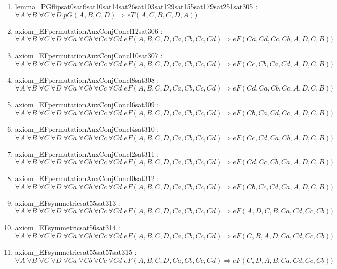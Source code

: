 \documentclass{article}
\begin{document}
\begin{enumerate}
\item lemma\_PGflipsat0sat6sat10sat14sat26sat103sat129sat155sat179sat251sat305 : $\forall A\;\forall B\;\forall C\;\forall D\;pG(A, B, C, D) \Rightarrow eT(A, C, B, C, D, A))$
\item axiom\_EFpermutationAuxConjConcl12sat306 : $\forall A\;\forall B\;\forall C\;\forall D\;\forall Ca\;\forall Cb\;\forall Cc\;\forall Cd\;eF(A, B, C, D, Ca, Cb, Cc, Cd) \Rightarrow eF(Ca, Cd, Cc, Cb, A, D, C, B))$
\item axiom\_EFpermutationAuxConjConcl10sat307 : $\forall A\;\forall B\;\forall C\;\forall D\;\forall Ca\;\forall Cb\;\forall Cc\;\forall Cd\;eF(A, B, C, D, Ca, Cb, Cc, Cd) \Rightarrow eF(Cc, Cb, Ca, Cd, A, D, C, B))$
\item axiom\_EFpermutationAuxConjConcl8sat308 : $\forall A\;\forall B\;\forall C\;\forall D\;\forall Ca\;\forall Cb\;\forall Cc\;\forall Cd\;eF(A, B, C, D, Ca, Cb, Cc, Cd) \Rightarrow eF(Cd, Ca, Cb, Cc, A, D, C, B))$
\item axiom\_EFpermutationAuxConjConcl6sat309 : $\forall A\;\forall B\;\forall C\;\forall D\;\forall Ca\;\forall Cb\;\forall Cc\;\forall Cd\;eF(A, B, C, D, Ca, Cb, Cc, Cd) \Rightarrow eF(Cb, Ca, Cd, Cc, A, D, C, B))$
\item axiom\_EFpermutationAuxConjConcl4sat310 : $\forall A\;\forall B\;\forall C\;\forall D\;\forall Ca\;\forall Cb\;\forall Cc\;\forall Cd\;eF(A, B, C, D, Ca, Cb, Cc, Cd) \Rightarrow eF(Cc, Cd, Ca, Cb, A, D, C, B))$
\item axiom\_EFpermutationAuxConjConcl2sat311 : $\forall A\;\forall B\;\forall C\;\forall D\;\forall Ca\;\forall Cb\;\forall Cc\;\forall Cd\;eF(A, B, C, D, Ca, Cb, Cc, Cd) \Rightarrow eF(Cd, Cc, Cb, Ca, A, D, C, B))$
\item axiom\_EFpermutationAuxConjConcl0sat312 : $\forall A\;\forall B\;\forall C\;\forall D\;\forall Ca\;\forall Cb\;\forall Cc\;\forall Cd\;eF(A, B, C, D, Ca, Cb, Cc, Cd) \Rightarrow eF(Cb, Cc, Cd, Ca, A, D, C, B))$
\item axiom\_EFsymmetricsat55sat313 : $\forall A\;\forall B\;\forall C\;\forall D\;\forall Ca\;\forall Cb\;\forall Cc\;\forall Cd\;eF(A, B, C, D, Ca, Cb, Cc, Cd) \Rightarrow eF(A, D, C, B, Ca, Cd, Cc, Cb))$
\item axiom\_EFsymmetricsat56sat314 : $\forall A\;\forall B\;\forall C\;\forall D\;\forall Ca\;\forall Cb\;\forall Cc\;\forall Cd\;eF(A, B, C, D, Ca, Cb, Cc, Cd) \Rightarrow eF(C, B, A, D, Ca, Cd, Cc, Cb))$
\item axiom\_EFsymmetricsat55sat57sat315 : $\forall A\;\forall B\;\forall C\;\forall D\;\forall Ca\;\forall Cb\;\forall Cc\;\forall Cd\;eF(A, B, C, D, Ca, Cb, Cc, Cd) \Rightarrow eF(C, D, A, B, Ca, Cd, Cc, Cb))$

\end{enumerate}
\end{document}
